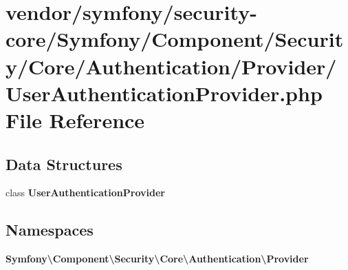 \section{vendor/symfony/security-\/core/\+Symfony/\+Component/\+Security/\+Core/\+Authentication/\+Provider/\+User\+Authentication\+Provider.php File Reference}
\label{_user_authentication_provider_8php}
\subsection*{Data Structures}
\begin{DoxyCompactItemize}
\item 
class {\bf User\+Authentication\+Provider}
\end{DoxyCompactItemize}
\subsection*{Namespaces}
\begin{DoxyCompactItemize}
\item 
 {\bf Symfony\textbackslash{}\+Component\textbackslash{}\+Security\textbackslash{}\+Core\textbackslash{}\+Authentication\textbackslash{}\+Provider}
\end{DoxyCompactItemize}
